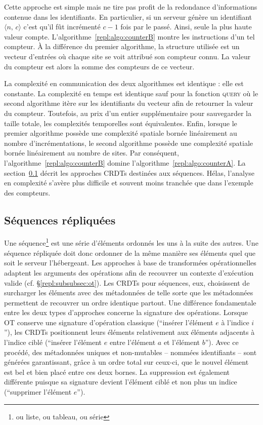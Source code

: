 Cette approche est simple mais ne tire pas profit de la redondance
d'informations contenue dans les identifiants. En particulier, si un serveur
génère un identifiant $\langle n,\, c\rangle$ c'est qu'il fût incrémenté $c-1$
fois par le passé. Ainsi, seule la plus haute valeur
compte. L'algorithme~\ref{repl:algo:counterB} montre les instructions d'un tel
compteur. À la différence du premier algorithme, la structure utilisée est un
vecteur d'entrées où chaque site se voit attribué son compteur connu. La valeur
du compteur est alors la somme des compteurs de ce vecteur.

La complexité en communication des deux algorithmes est identique : elle est
constante. La complexité en temps est identique sauf pour la fonction
\textsc{query} où le second algorithme itère sur les identifiants du vecteur
afin de retourner la valeur du compteur. Toutefois, au prix d'un entier
supplémentaire pour sauvegarder la taille totale, les complexités temporelles
sont équivalentes. Enfin, lorsque le premier algorithme possède une complexité
spatiale bornée linéairement au nombre d'incrémentations, le second algorithme
possède une complexité spatiale bornée linéairement au nombre de sites. Par
conséquent, l'algorithme~\ref{repl:algo:counterB} domine
l'algorithme~\ref{repl:algo:counterA}. La section~\ref{repl:subsec:sequences}
décrit les approches CRDTs destinées aux séquences. Hélas, l'analyse en
complexité s'avère plus difficile et souvent moins tranchée que dans l'exemple
des compteurs.


\subsection{Séquences répliquées}
\label{repl:subsec:sequences}

Une séquence\footnote{ou liste, ou tableau, ou série} est une série d'éléments
ordonnés les uns à la suite des autres. Une séquence répliquée doit donc
ordonner de la même manière ses éléments quel que soit le serveur
l'hébergeant. Les approches à base de transformées opérationnelles adaptent les
arguments des opérations afin de recouvrer un contexte d'exécution valide
(cf. §\ref{repl:subsubsec:ot}). Les CRDTs pour séquences, eux, choisissent de
surcharger les éléments avec des métadonnées de telle sorte que les métadonnées
permettent de recouvrer un ordre identique partout. Une différence fondamentale
entre les deux types d'approches concerne la signature des opérations. Lorsque
OT conserve une signature d'opération classique (``insérer l'élément $e$ à
l'indice $i$''), les CRDTs positionnent leurs éléments relativement aux éléments
adjacents à l'indice ciblé (``insérer l'élément $e$ entre l'élément $a$ et
l'élément $b$''). Avec ce procédé, des métadonnées uniques et non-mutables --
nommées identifiants -- sont générées garantissant, grâce à un ordre total sur
ceux-ci, que le nouvel élément est bel et bien placé entre ces deux bornes. La
suppression est également différente puisque sa signature devient l'élément
ciblé et non plus un indice (``supprimer l'élément $e$'').

